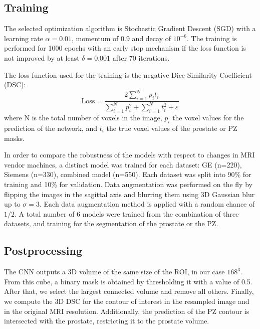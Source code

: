 \subsection{Training}
\label{subsec:training}
The selected optimization algorithm is Stochastic Gradient Descent (SGD) with a learning rate $\alpha = 0.01$, momentum of 0.9 and decay of $10^{-6}$. The training is performed for 1000 epochs with an early stop mechanism if the loss function is not improved by at least $\delta = 0.001$ after 70 iterations. 

The loss function used for the training is the negative Dice Similarity Coefficient (DSC):
\begin{equation}
\text{Loss} = \frac{2 \sum_{i=1}^{N}p_it_i}{\sum_{i=1}^{N}p_i^2 + \sum_{i=1}^{N}t_i^2 + \varepsilon} 
\label{eq:dsc}
\end{equation}
where N is the total number of voxels in the image, $p_i$ the voxel values for the prediction of the network, and $t_i$ the true voxel values of the prostate or PZ masks.

In order to compare the robustness of the models with respect to changes in MRI vendor machines,  a distinct model was trained for each dataset: GE (n=220), Siemens (n=330), combined model (n=550). Each dataset was split into 90\% for training and 10\% for validation. Data augmentation was performed on the fly by flipping the images in the sagittal axis and blurring them using 3D Gaussian blur up to $\sigma = 3$. Each data augmentation method is applied with a random chance of $1/2$.  
A total number of 6 models were trained from the combination of three datasets, and training for the segmentation of the prostate or the PZ. 

\subsection{Postprocessing}
The CNN outputs a 3D volume of the same size of the ROI, in our case $168^3$. From this cube, a binary mask is obtained by thresholding it with a value of 0.5. After that, we select the largest connected volume and remove all others. Finally, we compute the 3D DSC for the contour of interest in the resampled image and in the original MRI resolution. Additionally, the prediction of the PZ contour is intersected with the prostate, restricting it to the prostate volume.

